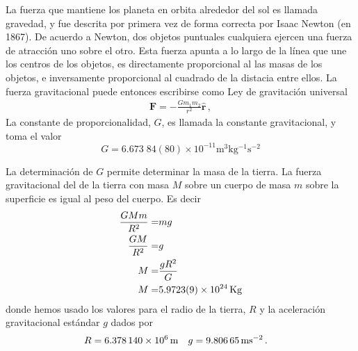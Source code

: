 \begin{frame}
La fuerza que mantiene los planeta en orbita alrededor del sol es llamada gravedad, y fue descrita por primera vez de forma correcta por Isaac Newton (en 1867). De acuerdo a Newton, dos objetos puntuales cualquiera ejercen una fuerza de atracción uno sobre el otro. Esta fuerza apunta a lo largo de la línea que une los centros de los objetos, es directamente proporcional al las masas de los objetos, e inversamente proporcional al cuadrado de la distacia entre ellos. La fuerza gravitacional puede entonces escribirse como 
Ley de gravitación universal
\begin{align}
  \label{eq:gravu}
  \mathbf{F}=-\frac{Gm_1m_2}{r^2}\hat{\mathbf{r}}\,,
\end{align}
La constante de proporcionalidad, $G$, es llamada la constante gravitacional, y toma el valor
\begin{equation}
  G=6.673\;84(80)\times 10^{-11}\si{\meter^3\kilo\gram^{-1}\second^{-2}}
\end{equation}
\end{frame}
La determinación de $G$ permite determinar la masa de la tierra. La fuerza gravitacional del de la tierra con masa $M$ sobre un cuerpo de masa $m$ sobre la superficie es igual al peso del cuerpo. Es decir
\begin{align*}
  \frac{GMm}{R^2}=&mg \nonumber\\
  \frac{GM}{R^2}=&g \nonumber\\
   M=&\frac{gR^2}{G}\nonumber\\
   M=&\SI{5.9723(9)E24}{Kg}
\end{align*}
donde hemos usado los valores para el radio de la tierra, $R$ y la aceleración gravitacional estándar $g$ dados por
\begin{align}
  R=\SI{6.378140E6}{m}& &g=\SI{9.80665}{m s^{-2}}\,.&
\end{align}

